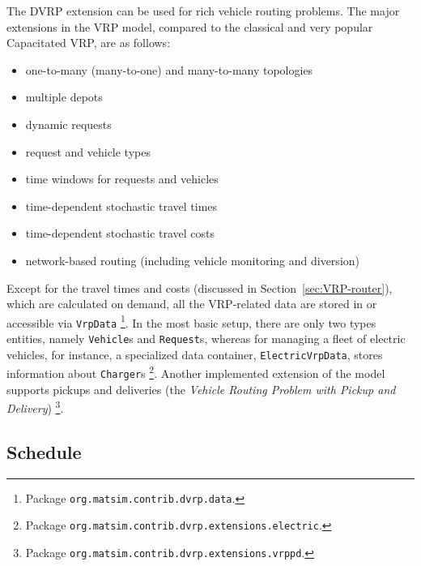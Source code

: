 The DVRP extension can be used for rich vehicle routing problems. The major extensions in the VRP model, compared to the classical and very popular Capacitated VRP, are as follows:
%
\begin{itemize}
	\item one-to-many (many-to-one) and many-to-many topologies
	\item multiple depots
	\item dynamic requests
	\item request and vehicle types
	\item time windows for requests and vehicles
	\item time-dependent stochastic travel times
	\item time-dependent stochastic travel costs
	\item network-based routing (including vehicle monitoring and diversion)
\end{itemize}
%
Except for the travel times and costs (discussed in Section~\ref{sec:VRP-router}), which are calculated on demand, all the VRP-related data are stored in or accessible via \lstinline$VrpData$%
\footnote{
Package \lstinline$org.matsim.contrib.dvrp.data$.
}.
In the most basic setup, there are only two types entities, namely \lstinline$Vehicle$s and \lstinline$Request$s, whereas for managing a fleet of electric vehicles, for instance, a specialized data container, \lstinline$ElectricVrpData$, stores information about \lstinline$Charger$s%
\footnote{
Package \lstinline$org.matsim.contrib.dvrp.extensions.electric$.
}.
Another implemented extension of the model supports pickups and deliveries (the \emph{Vehicle Routing Problem with Pickup and Delivery})%
\footnote{
Package \lstinline$org.matsim.contrib.dvrp.extensions.vrppd$.
}.

\subsection{Schedule}
\label{sec:VRP-schedule}

